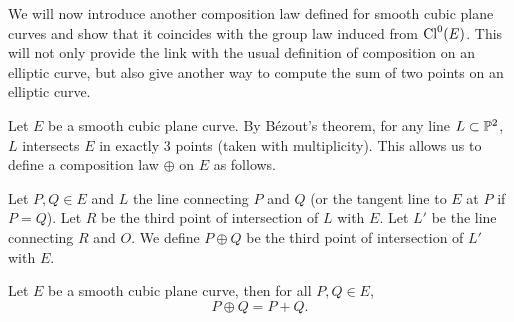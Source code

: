 
We will now introduce another composition law defined for smooth cubic plane
curves and show that it coincides with the group law induced from $\operatorname{Cl}^0(E)$.
This will not only provide the link with the usual definition of composition
on an elliptic curve, but also give another way to compute the sum
of two points on an elliptic curve.

Let $E$ be a smooth cubic plane curve.
By Bézout's theorem, for any line $L \subset \mathbb{P}^2$, $L$ intersects
$E$ in exactly 3 points (taken with multiplicity).
This allows us to define a composition law $\oplus$ on $E$ as
follows.

\begin{definition}
	\label{def:group-law}
	Let $P, Q \in E$ and $L$ the line connecting $P$ and $Q$ (or the tangent line
	to $E$ at $P$ if $P = Q$). Let $R$ be the third point of intersection of $L$
	with $E$. Let $L'$ be the line connecting $R$ and $O$. We define $P \oplus Q$
	be the third point of intersection of $L'$ with $E$.
\end{definition}


\begin{proposition}
	\label{prop:equivalence-composition}
	Let $E$ be a smooth cubic plane curve, then for all $P, Q \in E$,
	\begin{equation*}
		P \oplus Q = P + Q.
	\end{equation*}
\end{proposition}

